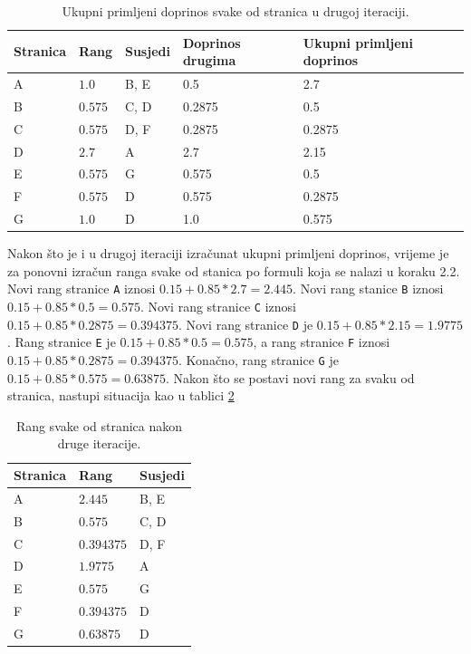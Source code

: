 \documentclass[times, utf8, zavrsni, numeric]{fer}
\begin{document}
\pagebreak

\begin{table}[htb]
\caption{Ukupni primljeni doprinos svake od stranica u drugoj iteraciji.}
\label{tbl:pageRankKorak22ap2}
\centering
\begin{tabular}{lllll} 
\hline
Stranica & Rang & Susjedi & Doprinos drugima & Ukupni primljeni doprinos\\
\hline
A & $1.0$ & B, E & 0.5 & 2.7\\
B & $0.575$ & C, D & 0.2875 & 0.5\\
C & $0.575$ & D, F & 0.2875 & 0.2875\\
D & $2.7$ & A & 2.7 & 2.15\\
E & $0.575$ & G & 0.575 & 0.5\\
F & $0.575$ & D & 0.575 & 0.2875\\
G & $1.0$ & D & 1.0 & 0.575\\
\hline
\end{tabular}
\end{table}

Nakon što je i u drugoj iteraciji izračunat ukupni primljeni doprinos, vrijeme je za ponovni izračun ranga svake od stanica po formuli koja se nalazi u koraku 2.2. Novi rang stranice \texttt{A} iznosi $0.15 + 0.85 * 2.7 = 2.445$. Novi rang stanice \texttt{B} iznosi $0.15 + 0.85 * 0.5 = 0.575$. Novi rang stranice \texttt{C} iznosi $0.15 + 0.85 * 0.2875 = 0.394375 $. Novi rang stranice \texttt{D} je $0.15 + 0.85 * 2.15 = 1.9775$.
Rang stranice \texttt{E} je $0.15 + 0.85 * 0.5 = 0.575$, a rang stranice \texttt{F} iznosi $0.15 + 0.85 * 0.2875 = 0.394375$. Konačno, rang stranice \texttt{G} je $0.15 + 0.85 * 0.575 = 0.63875$. Nakon što se postavi novi rang za svaku od stranica, nastupi situacija kao u tablici \ref{tbl:pageRankStanje2}

\begin{table}[htb]
\caption{Rang svake od stranica nakon druge iteracije.}
\label{tbl:pageRankStanje2}
\centering
\begin{tabular}{lll} 
\hline
Stranica & Rang & Susjedi \\
\hline
A & $2.445$ & B, E\\
B & $0.575$ & C, D\\
C & $0.394375$ & D, F\\
D & $1.9775$ & A\\
E & $0.575$ & G\\
F & $0.394375$ & D\\
G & $0.63875$ & D\\
\hline
\end{tabular}
\end{table}
\end{document}
